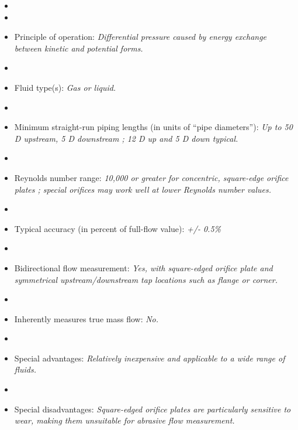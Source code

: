 \documentclass[12pt,a4paper]{article}
\begin{document}
\begin{itemize}
\goodbreak
\item{} 
\vskip 5pt
\item\item{} Principle of operation: {\it Differential pressure caused by energy exchange between kinetic and potential forms.}
\vskip 5pt
\item\item{} Fluid type(s): {\it Gas or liquid.}
\vskip 5pt
\item\item{} Minimum straight-run piping lengths (in units of ``pipe diameters''): {\it Up to 50 D upstream, 5 D downstream ; 12 D up and 5 D down typical.}
\vskip 5pt
\item\item{} Reynolds number range: {\it 10,000 or greater for concentric, square-edge orifice plates ; special orifices may work well at lower Reynolds number values.}
\vskip 5pt
\item\item{} Typical accuracy (in percent of full-flow value): {\it +/- 0.5\%}
\vskip 5pt
\item\item{} Bidirectional flow measurement: {\it Yes, with square-edged orifice plate and symmetrical upstream/downstream tap locations such as flange or corner.}
\vskip 5pt
\item\item{} Inherently measures true mass flow: {\it No.}
\vskip 5pt
\item\item{} Special advantages: {\it Relatively inexpensive and applicable to a wide range of fluids.}
\vskip 5pt
\item\item{} Special disadvantages: {\it Square-edged orifice plates are particularly sensitive to wear, making them unsuitable for abrasive flow measurement.}
\end{itemize}
\end{document}
